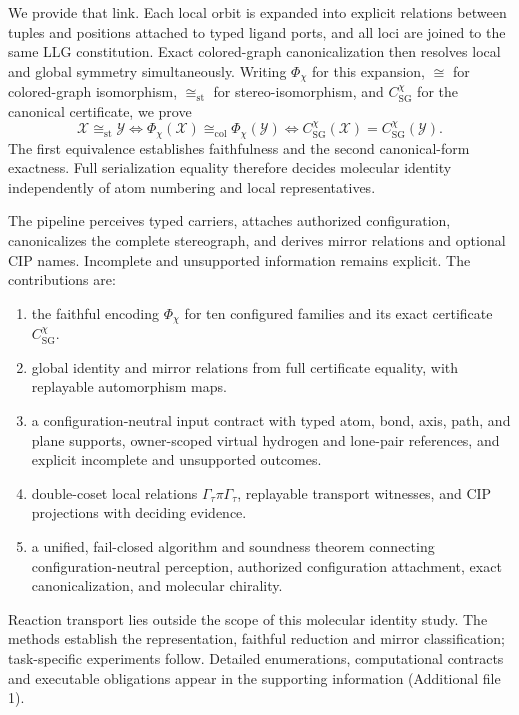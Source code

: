 \documentclass[pdflatex,sn-mathphys-num,referee,lineno]{sn-jnl}
\theoremstyle{plain}
\theoremstyle{remark}
\theoremstyle{definition}
\begin{document}
We provide that link.  Each local orbit is expanded into explicit relations
between tuples and positions attached to typed ligand ports, and all loci are
joined to the same LLG constitution.  Exact colored-graph canonicalization then
resolves local and global symmetry simultaneously.  Writing \(\Phi_\chi\) for
this expansion, \(\cong\) for colored-graph isomorphism, \(\cong_{\mathrm{st}}\)
for stereo-isomorphism, and \(C^\chi_{\mathrm{SG}}\) for the canonical
certificate, we prove
\begin{equation}
  \mathcal X\cong_{\mathrm{st}}\mathcal Y
  \iff
  \Phi_\chi(\mathcal X)\cong_{\mathrm{col}}\Phi_\chi(\mathcal Y)
  \iff
  C^\chi_{\mathrm{SG}}(\mathcal X)=C^\chi_{\mathrm{SG}}(\mathcal Y).
  \label{eq:intro-reduction}
\end{equation}
The first equivalence establishes faithfulness and the second canonical-form
exactness. Full serialization equality therefore decides molecular identity
independently of atom numbering and local representatives.

The pipeline perceives typed carriers, attaches authorized configuration,
canonicalizes the complete stereograph, and derives mirror relations and
optional CIP names. Incomplete and unsupported information remains explicit.
The contributions are:
\begin{enumerate}
  \item the faithful encoding \(\Phi_\chi\) for ten configured families and
        its exact certificate \(C^\chi_{\mathrm{SG}}\).
  \item global identity and mirror relations from full certificate equality,
        with replayable automorphism maps.
  \item a configuration-neutral input contract with typed atom, bond, axis,
        path, and plane supports, owner-scoped virtual hydrogen and lone-pair
        references, and explicit incomplete and unsupported outcomes.
  \item double-coset local relations \(\Gamma_\tau\pi\Gamma_\tau\), replayable
        transport witnesses, and CIP projections with deciding evidence.
  \item a unified, fail-closed algorithm and soundness theorem connecting
        configuration-neutral perception, authorized configuration attachment,
        exact canonicalization, and molecular chirality.
\end{enumerate}

Reaction transport lies outside the scope of this molecular identity study.
The methods establish the representation, faithful reduction and mirror
classification; task-specific experiments follow. Detailed enumerations,
computational contracts and executable obligations appear in the supporting
information (Additional file 1).
\end{document}
